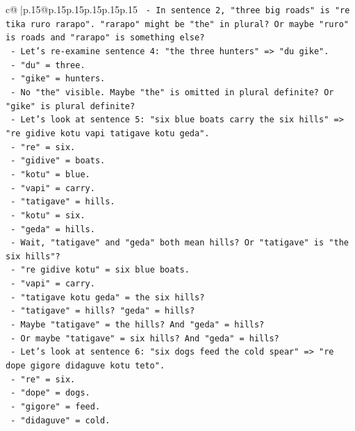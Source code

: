 \documentclass{article}
\begin{document}
{\begin{supertabular}{c@{$\;$}|p{.15\linewidth}@{}p{.15\linewidth}p{.15\linewidth}p{.15\linewidth}p{.15\linewidth}p{.15\linewidth}}
{{{\texttt{     {-} In sentence 2, "three big roads" is "re tika ruro rarapo". "rarapo" might be "the" in plural? Or maybe "ruro" is roads and "rarapo" is something else?} \\
\texttt{     {-} Let's re{-}examine sentence 4: "the three hunters" => "du gike".} \\
\texttt{       {-} "du" = three.} \\
\texttt{       {-} "gike" = hunters.} \\
\texttt{       {-} No "the" visible. Maybe "the" is omitted in plural definite? Or "gike" is plural definite?} \\
\texttt{     {-} Let's look at sentence 5: "six blue boats carry the six hills" => "re gidive kotu vapi tatigave kotu geda".} \\
\texttt{       {-} "re" = six.} \\
\texttt{       {-} "gidive" = boats.} \\
\texttt{       {-} "kotu" = blue.} \\
\texttt{       {-} "vapi" = carry.} \\
\texttt{       {-} "tatigave" = hills.} \\
\texttt{       {-} "kotu" = six.} \\
\texttt{       {-} "geda" = hills.} \\
\texttt{       {-} Wait, "tatigave" and "geda" both mean hills? Or "tatigave" is "the six hills"?} \\
\texttt{       {-} "re gidive kotu" = six blue boats.} \\
\texttt{       {-} "vapi" = carry.} \\
\texttt{       {-} "tatigave kotu geda" = the six hills?} \\
\texttt{       {-} "tatigave" = hills? "geda" = hills?} \\
\texttt{       {-} Maybe "tatigave" = the hills? And "geda" = hills?} \\
\texttt{       {-} Or maybe "tatigave" = six hills? And "geda" = hills?} \\
\texttt{       {-} Let's look at sentence 6: "six dogs feed the cold spear" => "re dope gigore didaguve kotu teto".} \\
\texttt{         {-} "re" = six.} \\
\texttt{         {-} "dope" = dogs.} \\
\texttt{         {-} "gigore" = feed.} \\
\texttt{         {-} "didaguve" = cold.} \\
}}}
\end{supertabular}}
\end{document}

